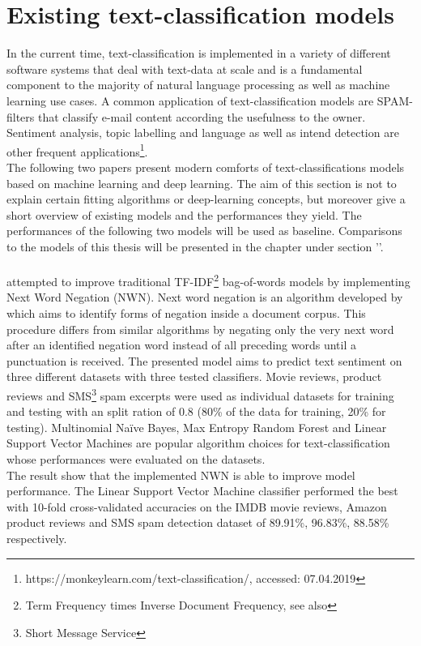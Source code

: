 \section{Existing text-classification models}
In the current time, text-classification is implemented in a variety of different software systems that deal with text-data at scale and is a fundamental component to the majority of natural language processing as well as machine learning use cases. A common application of text-classification models are SPAM-filters that classify e-mail content according the usefulness to the owner. Sentiment analysis, topic labelling and language as well as intend detection are other frequent applications\footnote{https://monkeylearn.com/text-classification/, accessed: 07.04.2019}.\\
The following two papers present modern comforts of text-classifications models based on machine learning and deep learning. The aim of this section is not to explain certain fitting algorithms or deep-learning concepts, but moreover give a short overview of existing models and the performances they yield. The performances of the following two models will be used as baseline. Comparisons to the models of this thesis will be presented in the  chapter under section ''. 

\paragraph*{\textcite{Das2018}} attempted to improve traditional TF-IDF\footnote{Term Frequency times Inverse Document Frequency, see also } bag-of-words models by implementing Next Word Negation (NWN). Next word negation is an algorithm developed by \textcite{Das2018} which aims to identify forms of negation inside a document corpus. This procedure differs from similar algorithms by negating only the very next word after an identified negation word instead of all preceding words until a punctuation is received. The presented model aims to predict text sentiment on three different datasets with three tested classifiers. Movie reviews, product reviews and SMS\footnote{Short Message Service} spam excerpts were used as individual datasets for training and testing with an split ration of 0.8 (80\% of the data for training, 20\%  for testing). Multinomial Na\"ive Bayes, Max Entropy Random Forest and Linear Support Vector Machines are popular algorithm choices for text-classification whose performances were evaluated on the datasets. \\
The result show that the implemented NWN is able to improve model performance. The Linear Support Vector Machine classifier performed the best with 10-fold cross-validated accuracies on the IMDB movie reviews, Amazon product reviews and SMS spam detection dataset of 89.91\%, 96.83\%, 88.58\% respectively.

